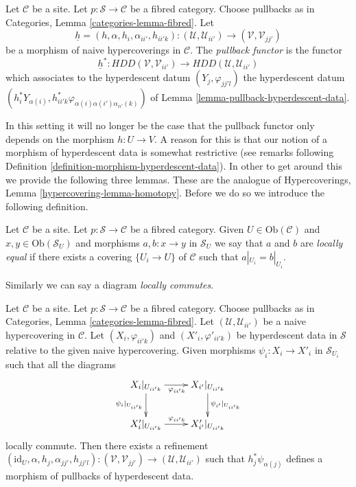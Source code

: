 \begin{definition}
\label{definition-pullback-hyperdescent-data}
Let $\mathcal{C}$ be a site.
Let $p : \mathcal{S} \to \mathcal{C}$ be a fibred category.
Choose pullbacks as in Categories, Lemma \ref{categories-lemma-fibred}.
Let
$$
\underline{h} = (h, \alpha, h_i, \alpha_{ii'}, h_{ii'k}) :
(\mathcal{U}, \mathcal{U}_{ii'})
\longrightarrow
(\mathcal{V}, \mathcal{V}_{jj'})
$$
be a morphism of naive hypercoverings in $\mathcal{C}$.
The {\it pullback functor} is the functor
$$
\underline{h}^* :
HDD(\mathcal{V}, \mathcal{V}_{ii'})
\longrightarrow
HDD(\mathcal{U}, \mathcal{U}_{ii'})
$$
which associates to the hyperdescent datum
$(Y_j, \varphi_{jj'l})$ the hyperdescent datum
$(h_i^*Y_{\alpha(i)}, h_{ii'k}^*\varphi_{\alpha(i)\alpha(i')\alpha_{ii'}(k)})$
of Lemma \ref{lemma-pullback-hyperdescent-data}.
\end{definition}

\noindent
In this setting it will no longer be the case that
the pullback functor only depends on the morphism $h : U \to V$.
A reason for this is that our notion of a morphism of
hyperdescent data is somewhat restrictive (see remarks following
Definition \ref{definition-morphism-hyperdescent-data}).
In other to get around this we provide
the following three lemmas. These are the
analogue of Hypercoverings, Lemma \ref{hypercovering-lemma-homotopy}.
Before we do so we introduce the following definition.

\begin{definition}
\label{definition-locally-commute}
Let $\mathcal{C}$ be a site.
Let $p : \mathcal{S} \to \mathcal{C}$ be a fibred category.
Given $U \in \text{Ob}(\mathcal{C})$ and
$x, y \in \text{Ob}(\mathcal{S}_U)$ and morphisms
$a, b : x \to y$ in $\mathcal{S}_U$ we say that $a$ and
$b$ are {\it locally equal} if there exists a covering
$\{U_i \to U\}$ of $\mathcal{C}$ such that $a|_{U_i} = b|_{U_i}$.
\end{definition}

\noindent
Similarly we can say a diagram {\it locally commutes}.

\begin{lemma}
\label{lemma-fix-morphism-hyperdescent-data}
Let $\mathcal{C}$ be a site.
Let $p : \mathcal{S} \to \mathcal{C}$ be a fibred category.
Choose pullbacks as in Categories, Lemma \ref{categories-lemma-fibred}.
Let
$(\mathcal{U}, \mathcal{U}_{ii'})$
be a naive hypercovering in $\mathcal{C}$.
Let $(X_i, \varphi_{ii'k})$ and $(X'_i, \varphi'_{ii'k})$
be hyperdescent data in $\mathcal{S}$
relative to the given naive hypercovering.
Given morphisms $\psi_i : X_i \to X'_i$ in $\mathcal{S}_{U_i}$
such that all the diagrams
$$
\xymatrix{
X_i|_{U_{ii'k}}
\ar[r]_{\varphi_{ii'k}}
\ar[d]_{\psi_i|_{U_{ii'k}}} &
X_{i'}|_{U_{ii'k}}
\ar[d]^{\psi_{i'}|_{U_{ii'k}}}
\\
X'_i|_{U_{ii'k}}
\ar[r]^{\varphi_{ii'k}}
&
X'_{i'}|_{U_{ii'k}}
}
$$
locally commute. Then there exists a refinement
$(\text{id}_U, \alpha, h_j, \alpha_{jj'}, h_{jj'l}) :
(\mathcal{V}, \mathcal{V}_{jj'}) \to (\mathcal{U}, \mathcal{U}_{ii'})$
such that $h_j^*\psi_{\alpha(j)}$ defines a morphism of pullbacks
of hyperdescent data.
\end{lemma}

